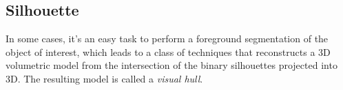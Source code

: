 
\subsection{Silhouette}
In some cases, it's an easy task to perform a foreground segmentation of the object of interest, which leads to a class of techniques that reconstructs a 3D volumetric model from the intersection of the binary silhouettes projected into 3D. The resulting model is called a \textit{visual hull}.

